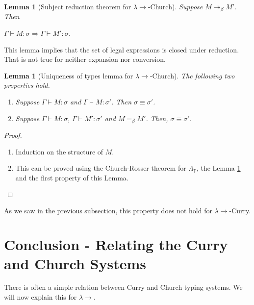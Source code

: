 \documentclass{llncs}
\newcommand{\lambdasystem}[0]{{\lambda}{\rightarrow}}
\theoremstyle{definition}
\numberwithin{mydef}{subsection}
\theoremstyle{plain}
\newtheorem{mylm}[mydef]{Lemma}
\theoremstyle{remark}
\begin{document}
	\begin{mylm}[Subject reduction theorem for $\lambdasystem$-Church]\label{lm:subject-reduction-church}
		Suppose $M \twoheadrightarrow _{\beta} M '$. Then
		\begin{center}
			$\Gamma \vdash M : \sigma \Rightarrow \Gamma \vdash M ' : \sigma$.
		\end{center}
	\end{mylm}
	
	This lemma implies that the set of legal expressions is closed under reduction.
	That is not true for neither expansion nor conversion. \\
	
	\begin{mylm}[Uniqueness of types lemma for $\lambdasystem$-Church]
		The following two properties hold.
		\begin{enumerate}
			\item Suppose $\Gamma \vdash M : \sigma$ and $\Gamma \vdash M : \sigma '$. Then $\sigma \equiv \sigma '$.
			\item Suppose $\Gamma \vdash M : \sigma$, $\Gamma \vdash M ' : \sigma '$ and $M = _{\beta} M '$. Then, $\sigma \equiv \sigma '$.
		\end{enumerate}
	\end{mylm}
	
	\begin{proof}
		\begin{enumerate}
			\item Induction on the structure of $M$.
			\item This can be proved using the Church-Rosser theorem for $\Lambda _{\mathbb{T}}$, the Lemma \ref{lm:subject-reduction-church} and the first property of this Lemma.
		\end{enumerate}
	\end{proof}
	
	As we saw in the previous subsection, this property does not hold for $\lambdasystem$-Curry.
	
	
	\section{Conclusion - Relating the Curry and Church Systems}\label{sec:relating}
	
	There is often a simple relation between Curry and Church typing systems.
	We will now explain this for $\lambdasystem$.
	
\end{document}
